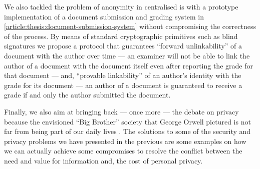 We also tackled the problem of anonymity in centralised \ac{is} with a prototype 
implementation of a document submission and grading system in \cref{article:thesis:document-submission-system} 
without compromising the correctness of the process. By means of standard cryptographic 
primitives such as blind signatures we propose a protocol that guarantees ``forward 
unlinkability'' of a document with the author over time --- an examiner will not 
be able to link the author of a document with the document itself even after reporting 
the grade for that document --- and, ``provable linkability'' of an author's identity 
with the grade for its document --- an author of a document is guaranteed to receive 
a grade if and only the author submitted the document.

Finally, we also aim at bringing back --- once more --- the debate on privacy because 
the envisioned ``Big Brother'' society that George Orwell pictured is not far from 
being part of our daily lives \cite{Orwell49}. The solutions to some of the security 
and privacy problems we have presented in the previous  
are some examples on how we can actually achieve some compromises to resolve the 
conflict between the need and value for information and, the cost of personal privacy.

